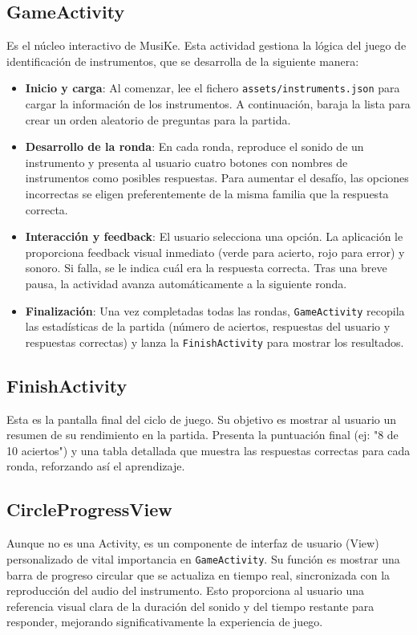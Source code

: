 \documentclass{article}
\newcommand{\iconpath}{/home/khz/git/tabler-icons/icons/outline-white/}
\newcommand{\icon}[1]{}
\begin{document}
\subsection{GameActivity \icon{device-gamepad-2}}
Es el núcleo interactivo de MusiKe. Esta actividad gestiona la lógica del juego de identificación de instrumentos, que se desarrolla de la siguiente manera:
\begin{itemize}
    \item \textbf{Inicio y carga}: Al comenzar, lee el fichero \texttt{assets/instruments.json} para cargar la información de los instrumentos. A continuación, baraja la lista para crear un orden aleatorio de preguntas para la partida.
    \item \textbf{Desarrollo de la ronda}: En cada ronda, reproduce el sonido de un instrumento y presenta al usuario cuatro botones con nombres de instrumentos como posibles respuestas. Para aumentar el desafío, las opciones incorrectas se eligen preferentemente de la misma familia que la respuesta correcta.
    \item \textbf{Interacción y feedback}: El usuario selecciona una opción. La aplicación le proporciona feedback visual inmediato (verde para acierto, rojo para error) y sonoro. Si falla, se le indica cuál era la respuesta correcta. Tras una breve pausa, la actividad avanza automáticamente a la siguiente ronda.
    \item \textbf{Finalización}: Una vez completadas todas las rondas, \texttt{GameActivity} recopila las estadísticas de la partida (número de aciertos, respuestas del usuario y respuestas correctas) y lanza la \texttt{FinishActivity} para mostrar los resultados.
\end{itemize}

\subsection{FinishActivity \icon{award}}
Esta es la pantalla final del ciclo de juego. Su objetivo es mostrar al usuario un resumen de su rendimiento en la partida. Presenta la puntuación final (ej: "8 de 10 aciertos") y una tabla detallada que muestra las respuestas correctas para cada ronda, reforzando así el aprendizaje.

\subsection{CircleProgressView \icon{chart-pie}}
Aunque no es una Activity, es un componente de interfaz de usuario (View) personalizado de vital importancia en \texttt{GameActivity}. Su función es mostrar una barra de progreso circular que se actualiza en tiempo real, sincronizada con la reproducción del audio del instrumento. Esto proporciona al usuario una referencia visual clara de la duración del sonido y del tiempo restante para responder, mejorando significativamente la experiencia de juego.
\end{document}
